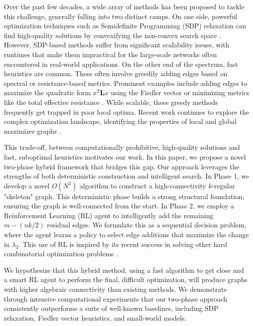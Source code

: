 \documentclass{article}
\begin{document}
Over the past few decades, a wide array of methods has been proposed to tackle this challenge, generally falling into two distinct camps. On one side, powerful optimization techniques such as Semidefinite Programming (SDP) relaxation can find high-quality solutions by convexifying the non-convex search space \cite{ghosh2006growing, de2013semidefinite}. However, SDP-based methods suffer from significant scalability issues, with runtimes that make them impractical for the large-scale networks often encountered in real-world applications. On the other end of the spectrum, fast heuristics are common. These often involve greedily adding edges based on spectral or resistance-based metrics. Prominent examples include adding edges to maximize the quadratic form $x^T \mathbf{L} x$ using the Fiedler vector \cite{ghosh2006growing} or minimizing metrics like the total effective resistance \cite{ghosh2008maximizing}. While scalable, these greedy methods frequently get trapped in poor local optima. Recent work continues to explore the complex optimization landscape, identifying the properties of local and global maximizer graphs \cite{belk2023algebraic}.

This trade-off, between computationally prohibitive, high-quality solutions and fast, suboptimal heuristics motivates our work. In this paper, we propose a novel two-phase hybrid framework that bridges this gap. Our approach leverages the strengths of both deterministic construction and intelligent search. In Phase 1, we develop a novel $O(N^2)$ algorithm to construct a high-connectivity $k$-regular "skeleton" graph. This deterministic phase builds a strong structural foundation, ensuring the graph is well-connected from the start. In Phase 2, we employ a Reinforcement Learning (RL) agent to intelligently add the remaining $m - (nk/2)$ residual edges. We formulate this as a sequential decision problem, where the agent learns a policy to select edge additions that maximize the change in $\lambda_2$. This use of RL is inspired by its recent success in solving other hard combinatorial optimization problems \cite{bello2016neural}.

We hypothesize that this hybrid method, using a fast algorithm to get close and a smart RL agent to perform the final, difficult optimization, will produce graphs with higher algebraic connectivity than existing methods. We demonstrate through intensive computational experiments that our two-phase approach consistently outperforms a suite of well-known baselines, including SDP relaxation, Fiedler vector heuristics, and small-world models.
\end{document}
